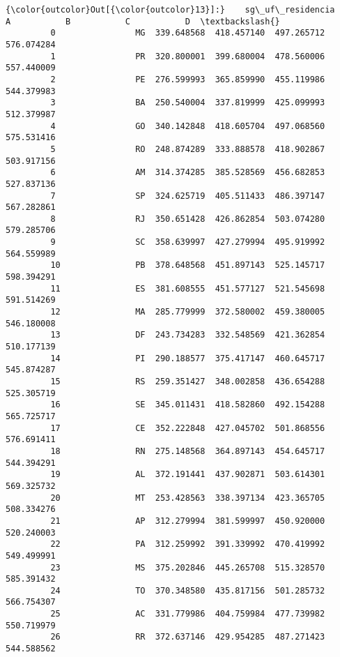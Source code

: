 \documentclass[11pt]{article}
\begin{document}
\begin{Verbatim}[commandchars=\\\{\}]
{\color{outcolor}Out[{\color{outcolor}13}]:}    sg\_uf\_residencia           A           B           C           D  \textbackslash{}
         0                MG  339.648568  418.457140  497.265712  576.074284   
         1                PR  320.800001  399.680004  478.560006  557.440009   
         2                PE  276.599993  365.859990  455.119986  544.379983   
         3                BA  250.540004  337.819999  425.099993  512.379987   
         4                GO  340.142848  418.605704  497.068560  575.531416   
         5                RO  248.874289  333.888578  418.902867  503.917156   
         6                AM  314.374285  385.528569  456.682853  527.837136   
         7                SP  324.625719  405.511433  486.397147  567.282861   
         8                RJ  350.651428  426.862854  503.074280  579.285706   
         9                SC  358.639997  427.279994  495.919992  564.559989   
         10               PB  378.648568  451.897143  525.145717  598.394291   
         11               ES  381.608555  451.577127  521.545698  591.514269   
         12               MA  285.779999  372.580002  459.380005  546.180008   
         13               DF  243.734283  332.548569  421.362854  510.177139   
         14               PI  290.188577  375.417147  460.645717  545.874287   
         15               RS  259.351427  348.002858  436.654288  525.305719   
         16               SE  345.011431  418.582860  492.154288  565.725717   
         17               CE  352.222848  427.045702  501.868556  576.691411   
         18               RN  275.148568  364.897143  454.645717  544.394291   
         19               AL  372.191441  437.902871  503.614301  569.325732   
         20               MT  253.428563  338.397134  423.365705  508.334276   
         21               AP  312.279994  381.599997  450.920000  520.240003   
         22               PA  312.259992  391.339992  470.419992  549.499991   
         23               MS  375.202846  445.265708  515.328570  585.391432   
         24               TO  370.348580  435.817156  501.285732  566.754307   
         25               AC  331.779986  404.759984  477.739982  550.719979   
         26               RR  372.637146  429.954285  487.271423  544.588562   
         

\end{Verbatim}
\end{document}
